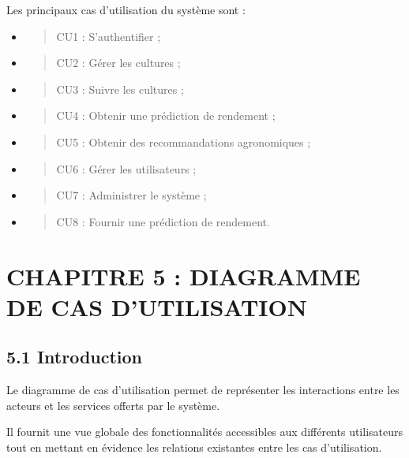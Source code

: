 \documentclass[
]{book}
\begin{document}
Les principaux cas d'utilisation du système sont :

\begin{itemize}
\item
  \begin{quote}
  CU1 : S'authentifier ;
  \end{quote}
\item
  \begin{quote}
  CU2 : Gérer les cultures ;
  \end{quote}
\item
  \begin{quote}
  CU3 : Suivre les cultures ;
  \end{quote}
\item
  \begin{quote}
  CU4 : Obtenir une prédiction de rendement ;
  \end{quote}
\item
  \begin{quote}
  CU5 : Obtenir des recommandations agronomiques ;
  \end{quote}
\item
  \begin{quote}
  CU6 : Gérer les utilisateurs ;
  \end{quote}
\item
  \begin{quote}
  CU7 : Administrer le système ;
  \end{quote}
\item
  \begin{quote}
  CU8 : Fournir une prédiction de rendement.
  \end{quote}
\end{itemize}

\hypertarget{chapitre-5-diagramme-de-cas-dutilisation}{%
\chapter{CHAPITRE 5 : DIAGRAMME DE CAS
D'UTILISATION}\label{chapitre-5-diagramme-de-cas-dutilisation}}

\hypertarget{introduction-2}{%
\section{5.1 Introduction}\label{introduction-2}}

Le diagramme de cas d'utilisation permet de représenter les interactions
entre les acteurs et les services offerts par le système.

Il fournit une vue globale des fonctionnalités accessibles aux
différents utilisateurs tout en mettant en évidence les relations
existantes entre les cas d'utilisation.
\end{document}
